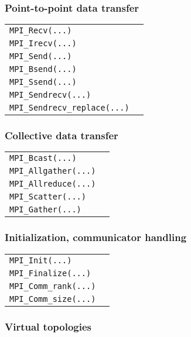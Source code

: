 \documentclass[11pt]{article}
\begin{document}
\subsubsection{Point-to-point data transfer}
\begin{tabular}{ p{7cm} l }
	\lstinline$MPI_Recv(...)$ & \\
	\lstinline$MPI_Irecv(...)$ & \\
	\lstinline$MPI_Send(...)$ & \\
	\lstinline$MPI_Bsend(...)$ & \\
	\lstinline$MPI_Ssend(...)$ & \\
	\lstinline$MPI_Sendrecv(...)$ & \\
	\lstinline$MPI_Sendrecv_replace(...)$ & \\
\end{tabular}

\subsubsection{Collective data transfer}

\begin{tabular}{ p{7cm} l }
	\lstinline$MPI_Bcast(...)$ & \\
	\lstinline$MPI_Allgather(...)$ & \\
	\lstinline$MPI_Allreduce(...)$ & \\
	\lstinline$MPI_Scatter(...)$ & \\
	\lstinline$MPI_Gather(...)$ & \\
\end{tabular}

\subsubsection{Initialization, communicator handling}

\begin{tabular}{ p{7cm} l }
	\lstinline$MPI_Init(...)$ & \\
	\lstinline$MPI_Finalize(...)$ & \\
	\lstinline$MPI_Comm_rank(...)$ & \\
	\lstinline$MPI_Comm_size(...)$ & \\
\end{tabular}

\subsubsection{Virtual topologies}
\end{document}
